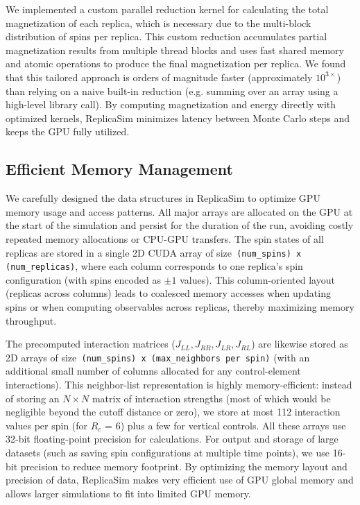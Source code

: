 \documentclass[journal=nalefd,manuscript=letter]{achemso}
\begin{document}
We implemented a custom parallel reduction kernel for calculating the total magnetization of each replica, which is necessary due to the multi-block distribution of spins per replica. This custom reduction accumulates partial magnetization results from multiple thread blocks and uses fast shared memory and atomic operations to produce the final magnetization per replica. We found that this tailored approach is orders of magnitude faster (approximately $10^{3×}$) than relying on a naive built-in reduction (e.g. summing over an array using a high-level library call). By computing magnetization and energy directly with optimized kernels, ReplicaSim minimizes latency between Monte Carlo steps and keeps the GPU fully utilized.

\subsection{Efficient Memory Management}
We carefully designed the data structures in ReplicaSim to optimize GPU memory usage and access patterns. All major arrays are allocated on the GPU at the start of the simulation and persist for the duration of the run, avoiding costly repeated memory allocations or CPU-GPU transfers. The spin states of all replicas are stored in a single 2D CUDA array of size\verb| (num_spins) x (num_replicas)|, where each column corresponds to one replica’s spin configuration (with spins encoded as $\pm1$ values). This column-oriented layout (replicas across columns) leads to coalesced memory accesses when updating spins or when computing observables across replicas, thereby maximizing memory throughput.

The precomputed interaction matrices ($J_{LL}, J_{RR}, J_{LR}, J_{RL}$) are likewise stored as 2D arrays of size\verb| (num_spins) x (max_neighbors per spin)| (with an additional small number of columns allocated for any control-element interactions). This neighbor-list representation is highly memory-efficient: instead of storing an $N \times N$ matrix of interaction strengths (most of which would be negligible beyond the cutoff distance or zero), we store at most 112 interaction values per spin (for $R_c$ = 6) plus a few for vertical controls. All these arrays use 32-bit floating-point precision for calculations. For output and storage of large datasets (such as saving spin configurations at multiple time points), we use 16-bit precision to reduce memory footprint. By optimizing the memory layout and precision of data, ReplicaSim makes very efficient use of GPU global memory and allows larger simulations to fit into limited GPU memory.
\end{document}
